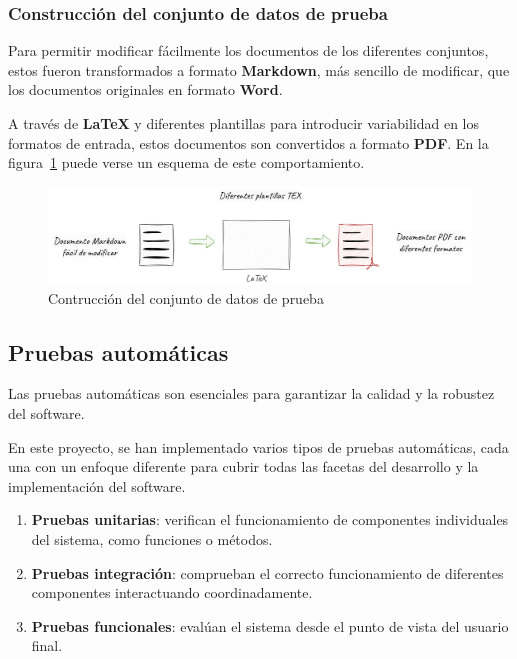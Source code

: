 \subsubsection*{Construcción del conjunto de datos de prueba}

Para permitir modificar fácilmente los documentos de los diferentes conjuntos, estos fueron transformados a formato
\textbf{Markdown}, más sencillo de modificar, que los documentos originales en formato \textbf{Word}.

A través de \textbf{LaTeX} y diferentes plantillas para introducir variabilidad en los formatos de entrada, estos
documentos son convertidos a formato \textbf{PDF}.
En la figura~\ref{fig:chapter_4.5.dataset_construction_overview} puede verse un esquema de este comportamiento.

\begin{figure}[ht]
    \begin{center}
        \includegraphics[width=\textwidth]{./chapter/4/images/chapter_4.5.dataset_construction_overview}
        \caption{Contrucción del conjunto de datos de prueba}
        \label{fig:chapter_4.5.dataset_construction_overview}
    \end{center}
\end{figure}


\subsection*{Pruebas automáticas}

Las pruebas automáticas son esenciales para garantizar la calidad y la robustez del software.

En este proyecto, se han implementado varios tipos de pruebas automáticas, cada una con un enfoque diferente para cubrir
todas las facetas del desarrollo y la implementación del software.

\begin{enumerate}
    \item \textbf{Pruebas unitarias}: verifican el funcionamiento de componentes individuales del sistema, como
    funciones o métodos.
    \item \textbf{Pruebas integración}: comprueban el correcto funcionamiento de diferentes componentes
    interactuando coordinadamente.
    \item \textbf{Pruebas funcionales}: evalúan el sistema desde el punto de vista del usuario final.
\end{enumerate}


